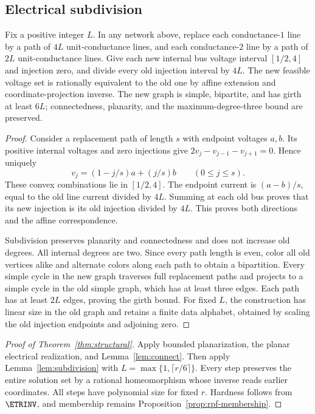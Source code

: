 \subsection{Electrical subdivision}

\begin{lemma}
\label{lem:subdivision}
Fix a positive integer $L$. In any network above, replace each conductance-$1$
line by a path of $4L$ unit-conductance lines, and each conductance-$2$ line
by a path of $2L$ unit-conductance lines. Give each new internal bus voltage
interval $[1/2,4]$ and injection zero, and divide every old injection interval
by $4L$. The new feasible voltage set is rationally equivalent to the old
one by affine extension and coordinate-projection inverse. The new graph is
simple, bipartite, and has girth at least $6L$; connectedness, planarity, and
the maximum-degree-three bound are preserved.
\end{lemma}
\begin{proof}
Consider a replacement path of length $s$ with endpoint voltages $a,b$.
Its positive internal voltages and zero injections give
$2v_j-v_{j-1}-v_{j+1}=0$. Hence uniquely
\[
 v_j=(1-j/s)a+(j/s)b\qquad(0\le j\le s).
\]
These convex combinations lie in $[1/2,4]$. The endpoint current is
$(a-b)/s$, equal to the old line current divided by $4L$. Summing at each
old bus proves that its new injection is its old injection divided by $4L$.
This proves both directions and the affine correspondence.

Subdivision preserves planarity and connectedness and does not increase old
degrees. All internal degrees are two. Since every path length is even,
color all old vertices alike and alternate colors along each path to obtain
a bipartition. Every simple cycle in the new graph traverses full replacement
paths and projects to a simple cycle in the old simple graph, which has at
least three edges. Each path has at least $2L$ edges, proving the girth bound.
For fixed $L$, the construction has linear size in the old graph and retains
a finite data alphabet, obtained by scaling the old injection endpoints and
adjoining zero.
\end{proof}

\begin{proof}[Proof of Theorem~\ref{thm:structural}]
Apply bounded planarization, the planar electrical realization, and
Lemma~\ref{lem:connect}. Then apply Lemma~\ref{lem:subdivision} with
$L=\max\{1,\lceil r/6\rceil\}$. Every step preserves the entire solution
set by a rational homeomorphism whose inverse reads earlier coordinates.
All steps have polynomial size for fixed $r$. Hardness follows from
$\ETRINV$, and membership remains Proposition~\ref{prop:rpf-membership}.
\end{proof}

